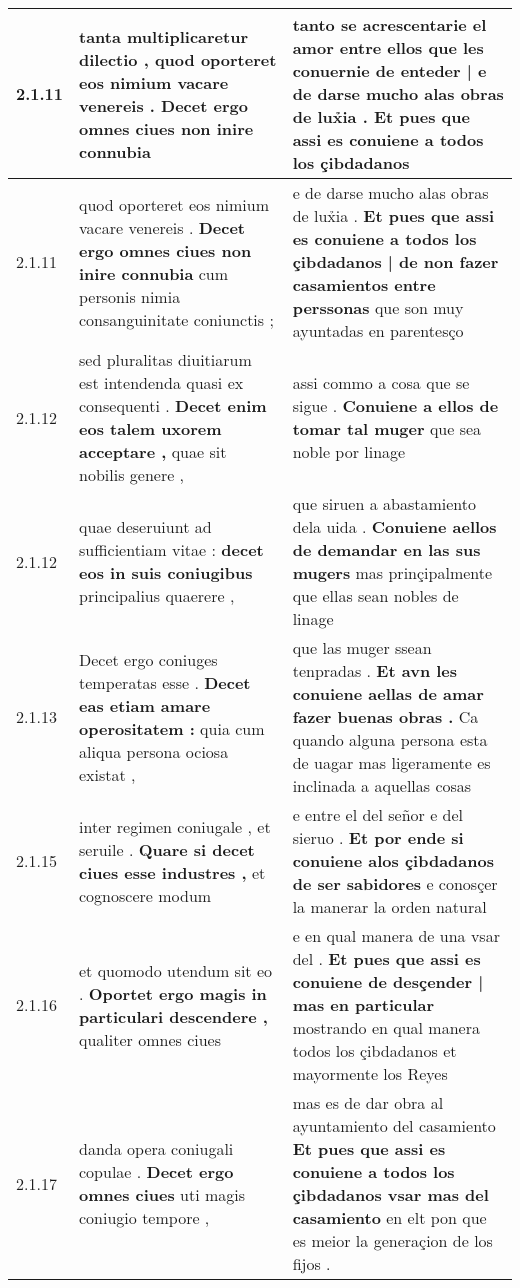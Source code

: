 \begin{tabular}{|p{1cm}|p{6.5cm}|p{6.5cm}|}
2.1.11 & tanta multiplicaretur dilectio , \textbf{ quod oporteret eos nimium vacare venereis . } Decet ergo omnes ciues non inire connubia & tanto se acrescentarie el amor entre ellos \textbf{ que les conuernie de enteder | e de darse mucho alas obras de lux̉ia . } Et pues que assi es conuiene a todos los çibdadanos \\\hline
2.1.11 & quod oporteret eos nimium vacare venereis . \textbf{ Decet ergo omnes ciues non inire connubia } cum personis nimia consanguinitate coniunctis ; & e de darse mucho alas obras de lux̉ia . \textbf{ Et pues que assi es conuiene a todos los çibdadanos | de non fazer casamientos entre perssonas } que son muy ayuntadas en parentesço \\\hline
2.1.12 & sed pluralitas diuitiarum est intendenda quasi ex consequenti . \textbf{ Decet enim eos talem uxorem acceptare , } quae sit nobilis genere , & assi commo a cosa que se sigue . \textbf{ Conuiene a ellos de tomar tal muger } que sea noble por linage \\\hline
2.1.12 & quae deseruiunt ad sufficientiam vitae : \textbf{ decet eos in suis coniugibus } principalius quaerere , & que siruen a abastamiento dela uida . \textbf{ Conuiene aellos de demandar en las sus mugers } mas prinçipalmente que ellas sean nobles de linage \\\hline
2.1.13 & Decet ergo coniuges temperatas esse . \textbf{ Decet eas etiam amare operositatem : } quia cum aliqua persona ociosa existat , & que las muger ssean tenpradas . \textbf{ Et avn les conuiene aellas de amar fazer buenas obras . } Ca quando alguna persona esta de uagar mas ligeramente es inclinada a aquellas cosas \\\hline
2.1.15 & inter regimen coniugale , et seruile . \textbf{ Quare si decet ciues esse industres , } et cognoscere modum & e entre el del señor e del sieruo . \textbf{ Et por ende si conuiene alos çibdadanos de ser sabidores } e conosçer la manerar la orden natural \\\hline
2.1.16 & et quomodo utendum sit eo . \textbf{ Oportet ergo magis in particulari descendere , } qualiter omnes ciues & e en qual manera de una vsar del . \textbf{ Et pues que assi es conuiene de desçender | mas en particular } mostrando en qual manera todos los çibdadanos et mayormente los Reyes \\\hline
2.1.17 & danda opera coniugali copulae . \textbf{ Decet ergo omnes ciues } uti magis coniugio tempore , & mas es de dar obra al ayuntamiento del casamiento \textbf{ Et pues que assi es conuiene a todos los çibdadanos vsar mas del casamiento } en elt pon que es meior la generaçion de los fijos . \\\hline

\end{tabular}
